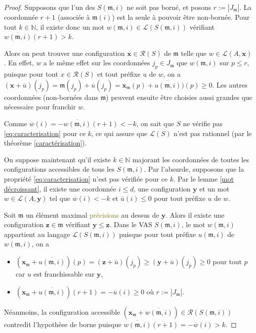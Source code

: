 \documentclass[a4paper,final]{article}
\theoremstyle{definition}
\let\leq\leqslant
\let\geq\geqslant
\newcommand{\lucas}[1]{\textcolor{olive}{#1}}
\newcommand{\N}{\ensuremath{\mathbb{N}}}
\newcommand{\card}[1]{|#1|}
\newcommand{\lang}{\ensuremath{\mathcal{L}}}
\newcommand{\conf}{\ensuremath{\mathcal{R}}}
\newcommand{\vect}[1]{\ensuremath{\mathbf{#1}}}
\newcommand{\valeur}[1]{\ensuremath{\overline{#1}}}
\begin{document}
\begin{proof}
Supposons que l'un des $S(\mathfrak{m},i)$ ne soit pas borné, et posons $r:=\card{J_\mathfrak{m}}$.
La coordonnée $r+1$ (associée à $\mathfrak{m}(i)$) est la seule à pouvoir être non-bornée.
Pour tout $k\in\N$, il existe donc un mot $w(\mathfrak{m},i) \in \lang(S(\mathfrak{m},i))$ vérifiant $\valeur{w(\mathfrak{m},i)}(r+1) >k$.

Alors on peut trouver une configuration $\vect{x}\in\conf(S)$ de $\mathfrak{m}$ telle que $w\in\lang(A,\vect{x})$.
En effet, $w$ a le même effet sur les coordonnées $j_p \in J_\mathfrak{m}$ que $w(\mathfrak{m},i)$ sur $p\leq r$,
puisque pour tout $x\in\conf(S)$ et tout préfixe $u$ de $w$, on a
$(\vect{x} +\valeur{u})(j_p) = 
\mathfrak{m}(j_p) +\valeur{u}(j_p) = 
\vect{x}_\mathfrak{m}(p) +\valeur{u(\mathfrak{m},i)})(p) \geq 0$.
Les autres coordonnées (non-bornées dans $\mathfrak{m}$) peuvent ensuite être choisies aussi grandes que nécessaire pour franchir $w$.

Comme $\valeur{w}(i) = -\valeur{w(\mathfrak{m},i)}(r+1) < -k$, on sait que $S$ ne vérifie pas \eqref{eq:caracterisation} pour ce $k$, 
ce qui assure que $\lang(S)$ n'est pas rationnel (par le théorème \ref{caractérisation}).

\vspace{3mm}
On suppose maintenant qu'il existe $k\in\N$ majorant les coordonnées de toutes les configurations accessibles de tous les $S(\mathfrak{m},i)$.
Par l'absurde, supposons que la propriété \eqref{eq:caracterisation} n'est pas vérifiée pour ce $k$.
Par le lemme \ref{mot décroissant}, il existe une coordonnée $i\leq d$, une configuration $\vect{y}$ et un mot $w\in \lang(A,\vect{y})$ tel que  $\valeur{w}(i) < -k$ et $\valeur{u}(i) \leq 0$ pour tout préfixe $u$ de $w$.

Soit $\mathfrak{m}$ un élément maximal \lucas{précisions} au dessus de $\vect{y}$.
Alors il existe une configuration $\vect{z}\in\mathfrak{m}$ vérifiant $\vect{y} \leq \vect{z}$.
Dans le VAS $S(\mathfrak{m},i)$, le mot $w(\mathfrak{m},i)$ appartient au langage $\lang(S(\mathfrak{m},i))$ 
puisque pour tout préfixe $u(\mathfrak{m},i)$ de $w(\mathfrak{m},i)$, on a 
\begin{itemize}
    \item $(\vect{x}_\mathfrak{m} +\valeur{u (\mathfrak{m},i)} )(p) = (\vect{z} +\valeur{u})(j_p) \geq (\vect{y} +\valeur{u})(j_p) \geq 0$ pour tout $p$ car $u$ est franchissable sur $\vect{y}$,
    \item $(\vect{x}_\mathfrak{m} +\valeur{u (\mathfrak{m},i)} )(r+1) = -\valeur{u}(i) \geq 0$ où $r:=\card{J_\mathfrak{m}}$.
\end{itemize}
Néanmoins, la configuration accessible $(\vect{x}_\mathfrak{m} + \valeur{w(\mathfrak{m},i)}) \in \conf(S(\mathfrak{m},i))$ contredit l'hypothèse de borne puisque $\valeur{w(\mathfrak{m},i)}(r+1) = -\valeur{w}(i) > k$.

\end{proof}
\end{document}
